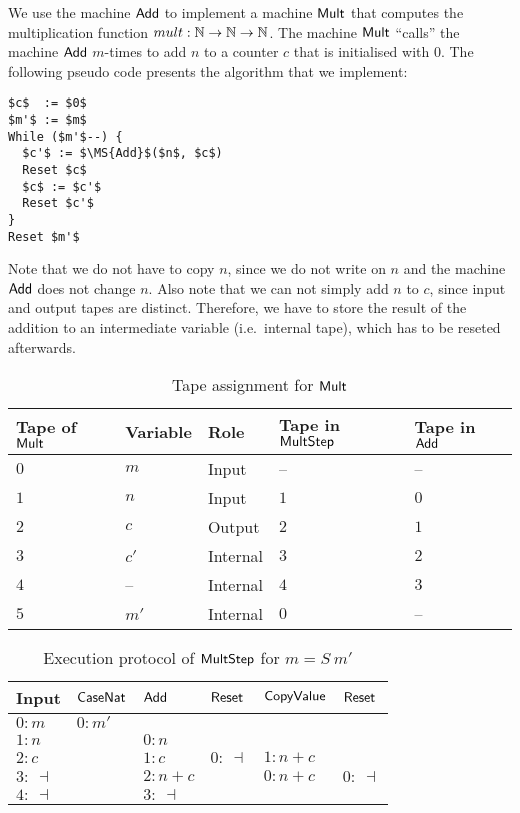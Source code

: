 We use the machine $\mathsf{Add}$ to implement a machine $\mathsf{Mult}$ that computes the multiplication function $mult : \mathbb{N}\rightarrow\mathbb{N}\rightarrow\mathbb{N}$.  The machine
$\mathsf{Mult}$ ``calls'' the machine $\mathsf{Add}$ $m$-times to add $n$ to a counter $c$ that is initialised with $0$.  The following pseudo code presents
the algorithm that we implement: { \small
\begin{lstlisting}[style=pseudocode]
$c$  := $0$
$m'$ := $m$
While ($m'$--) {
  $c'$ := $\MS{Add}$($n$, $c$)
  Reset $c$
  $c$ := $c'$
  Reset $c'$
}
Reset $m'$
\end{lstlisting}
}%
Note that we do not have to copy $n$, since we do not write on $n$ and the machine $\mathsf{Add}$ does not change
$n$.  Also note that we can not simply add $n$ to $c$, since input and output tapes are distinct.  Therefore, we have to store the result of the
addition to an intermediate variable (i.e.\ internal tape), which has to be reseted afterwards.

\begin{table}[t]
  \centering
  \begin{tabular}{l|l|l|l|l}
    Tape of $\mathsf{Mult}$ & Variable & Role & Tape in $\mathsf{MultStep}$ & Tape in $\mathsf{Add}$ \\ \hline
    $0$ & $m$  & Input    & --  & --  \\
    $1$ & $n$  & Input    & $1$ & $0$ \\
    $2$ & $c$  & Output   & $2$ & $1$ \\
    $3$ & $c'$ & Internal & $3$ & $2$ \\
    $4$ & --   & Internal & $4$ & $3$ \\
    $5$ & $m'$ & Internal & $0$ & --  \\
  \end{tabular}
  \caption{Tape assignment for $\mathsf{Mult}$}
  \label{tab:tapes-Mult}
\end{table}
\begin{table}[t]
  \centering
  \begin{tabular}{l||l|l|l|l|l}
    Input       & $\mathsf{CaseNat}$ & $\mathsf{Add}$  & $\mathsf{Reset}$ & $\mathsf{CopyValue}$ & $\mathsf{Reset}$   \\ \hline
    $0: m$      & $0 : m'$        &             &              &                  &                \\
    $1: n$      &                 & $0: n$      &              &                  &                \\
    $2: c$      &                 & $1: c$      & $0:~\dashv$  & $1: n+c$         &                \\
    $3:~\dashv$ &                 & $2: n+c$    &              & $0: n+c$         & $0:~\dashv$    \\
    $4:~\dashv$ &                 & $3:~\dashv$ &              &                  &                \\
  \end{tabular}
  \caption{Execution protocol of $\mathsf{MultStep}$ for $m=S~m'$}
  \label{tab:exec-MultStep}
\end{table}

